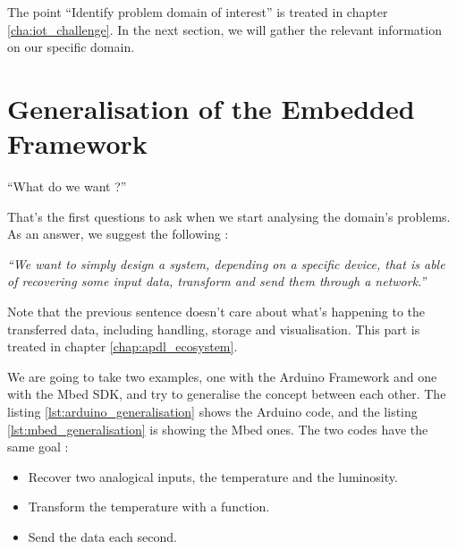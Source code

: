 The point ``Identify problem domain of interest'' is treated in chapter
\ref{cha:iot_challenge}. In the next section, we will gather the relevant information on our
specific domain.

\section{Generalisation of the Embedded Framework}
\label{sec:generalisation_framework}

``What do we want ?''

That's the first questions to ask when we start analysing the domain's problems.
As an answer, we suggest the following :

{ \Large \textit{``We want to simply design a system, depending on a specific
    device, that is able of recovering some input data, transform and
    send them through a network.''}
}

Note that the previous sentence doesn't care about what's happening to the
transferred data, including handling, storage and visualisation. This part is
treated in chapter \ref{chap:apdl_ecosystem}.

We are going to take two examples, one with the Arduino Framework and one with
the Mbed SDK, and try to generalise the concept between each other. The listing
\ref{lst:arduino_generalisation} shows the Arduino code, and the listing
\ref{lst:mbed_generalisation} is showing the Mbed ones. The two codes have the
same goal :

\begin{itemize}
\item Recover two analogical inputs, the temperature and the luminosity.
\item Transform the temperature with a function.
\item Send the data each second.
\end{itemize}

